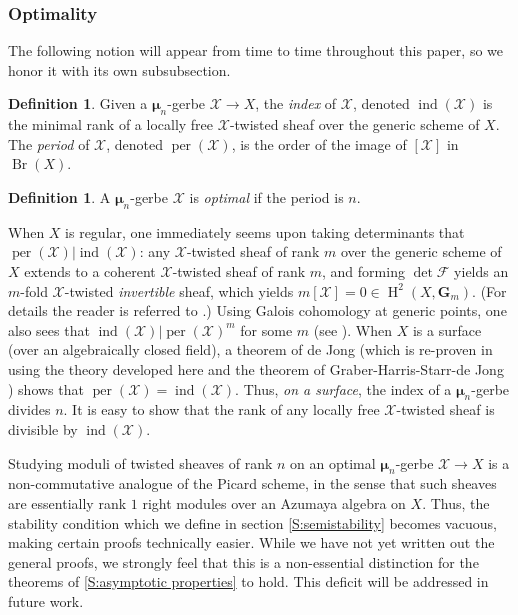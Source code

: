 \documentclass[11pt]{amsart}
\newcommand{\field}[1]{\mathbf #1}
\newcommand{\ms}[1]{\mathscr #1}
\newcommand{\m}{\boldsymbol{\mu}}
\newcommand{\G}{\field G} %
\renewcommand{\H}{\operatorname{H}}
\DeclareMathOperator{\per}{per}
\DeclareMathOperator{\ind}{ind}
\renewcommand{\[}{[\!\hspace{0.03em}[}
\renewcommand{\]}{]\!\hspace{0.03em}]}
\renewcommand{\(}{(\!\hspace{0.03em}(}
\renewcommand{\)}{)\!\hspace{0.03em})}
\DeclareMathOperator{\Br}{\operatorname{Br}}
\theoremstyle{definition}
\newtheorem{defn}[lem]{Definition}
\theoremstyle{remark}
\begin{document}
\subsubsection{Optimality}\label{S:optimality}

The following notion will appear from time to time throughout this 
paper, so we honor it with its own subsubsection.

\begin{defn} Given a $\m_{n}$-gerbe $\ms X\to X$, the \emph{index\/} 
of $\ms X$, denoted $\ind(\ms X)$ is the minimal rank of a locally free $\ms 
X$-twisted sheaf over the generic scheme of $X$.  The \emph{period\/} of $\ms X$, denoted $\per(\ms 
X)$, is the order of the 
image of $[\ms X]$ in $\Br(X)$.  
\end{defn}

\begin{defn}\label{D:optimal}
A $\m_n$-gerbe $\ms X$ is \emph{optimal\/} if the period is $n$.
\end{defn}

When $X$ is regular, one immediately seems upon taking determinants that  
$\per(\ms X)|\ind(\ms X)$: any $\ms X$-twisted sheaf of rank $m$ over the generic scheme of $X$ extends to a coherent $\ms X$-twisted sheaf of rank $m$, and forming $\det\ms F$ yields an $m$-fold $\ms X$-twisted \emph{invertible\/} sheaf, which yields $m[\ms X]=0\in\H^2(X,\G_m)$.  (For details the reader is referred to \cite{period-index-paper}.)  
Using Galois cohomology at generic points, one also sees that $\ind(\ms X)|\per(\ms X)^{m}$ for 
some $m$ (see \cite{lang-tate}).  When $X$ is a surface (over an algebraically closed field), a theorem of 
de Jong (which is re-proven in \cite{period-index-paper} using the 
theory developed here and the theorem of Graber-Harris-Starr-de Jong 
\cite{dejong-starr}) shows that $\per(\ms 
X)=\ind(\ms X)$.  Thus, \emph{on a surface\/}, the index of a 
$\m_{n}$-gerbe divides $n$.  It is easy to show that the rank of any locally 
free $\ms X$-twisted sheaf is divisible by $\ind(\ms X)$.

Studying moduli of twisted sheaves of rank $n$ on an optimal 
$\m_{n}$-gerbe $\ms X\to X$ is a non-commutative analogue of the Picard scheme, in 
the sense that such sheaves are essentially rank $1$ right modules 
over an Azumaya algebra on $X$.  Thus, the stability condition which 
we define in section \ref{S:semistability} becomes vacuous, making certain 
proofs technically easier.  While we have not yet written out the 
general proofs, we strongly feel that this is a non-essential 
distinction for the theorems of \ref{S:asymptotic properties} to 
hold.  This deficit will be addressed in future work.
\end{document}
